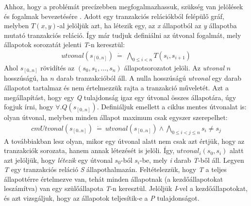 Ahhoz, hogy a problémát precízebben megfogalmazhassuk, szükség van jelölések és fogalmak bevezetésére \cite{k_induction_article}. Adott egy tranzakciós relációkból felépülő gráf, melyben $T(x, y)$-al jelöljük azt, ha létezik egy, az \emph{x} állapotból az \emph{y} állapotba mutató tranzakciós reláció. Így már tudjuk definiálni az útvonal fogalmát, mely állapotok sorozatát jelenti \emph{T}-n keresztül:
\begin{align}
	utvonal(s_{[0..n]})~\dot{=}~\bigwedge_{0 \leq i < n} T(s_{i}, s_{i+1})
\end{align}
Ahol $s_{[0..n]}$ rövidítés az $(s_{0}, s_{1}, \dots, s_{n})$ állapotsorozatot jelöli. Az \emph{utvonal} $n$ hosszúságú, ha $n$ darab tranzakcióból áll. A nulla hosszúságú \emph{utvonal} egy darab állapotot tartalmaz és nem értelmezzük rajta a tranzakció műveletét. Azt a megállapítást, hogy egy \emph{Q} tulajdonság igaz egy útvonal összes állapotára, úgy fogjuk írni, hogy $\forall . Q(s_{[0..n]})$.
\newline
\newline
Definiáljuk emellett a ciklus mentes útvonalat is: olyan útvonal, melyben minden állapot maximum csak egyszer szerepelhet:
\begin{align}
	cmUtvonal(s_{[0..n]})~\dot{=}~utvonal(s_{[0..n]}) \wedge \bigwedge_{0 \leq i < j \leq n} s_{i} \neq s_{j}
\end{align}
A továbbiakban lesz olyan, mikor egy útvonal alatt nem csak azt értjük, hogy az tranzakciók sorozata, hanem annak létezését is jelöli. Így, $utvonal_{i}(s_{0}, s_{i})$ alatt azt jelöljük, hogy \emph{létezik} egy útvonal $s_{0}$-ból $s_{i}$-be, mely \emph{i} darab \emph{T}-ből áll.
\newline
\newline
Legyen \emph{T} egy tranzakciós reláció \emph{S} állapothalmazán. Feltételezzük, hogy \emph{T} a teljes állapottérre értelmezve van, tehát minden állapotnak (a kezdőállapotokat leszámítva) van egy szülőállapota \emph{T}-n keresztül. Jelöljük \emph{I}-vel a kezdőállapotokat, és azt vizsgáljuk, hogy az állapotok teljesítik-e a \emph{P} tulajdonságot.

